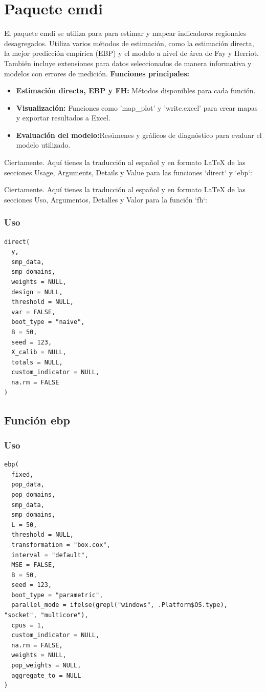 \documentclass[12pt,spanish]{article}
\begin{document}
\section*{Paquete emdi}

El paquete emdi se utiliza para para estimar y mapear indicadores regionales desagregados. Utiliza varios métodos de estimación, como la estimación directa, la mejor predicción empírica (EBP) y el modelo a nivel de área de Fay y Herriot. También incluye extensiones para datos seleccionados de manera informativa y modelos con errores de medición.
\textbf{Funciones principales:}
\begin{itemize}
    \item \textbf{Estimación directa, EBP y FH:} Métodos disponibles para cada función.
    \item \textbf{Visualización:} Funciones como 'map\_plot' y 'write.excel' para crear mapas y exportar resultados a Excel.
    \item \textbf{Evaluación del modelo:}Resúmenes y gráficos de diagnóstico para evaluar el modelo utilizado.
\end{itemize}

Ciertamente. Aquí tienes la traducción al español y en formato LaTeX de las secciones Usage, Arguments, Details y Value para las funciones `direct` y `ebp`:

Ciertamente. Aquí tienes la traducción al español y en formato LaTeX de las secciones Uso, Argumentos, Detalles y Valor para la función `fh`:

\subsubsection*{Uso}
\begin{verbatim}
direct(
  y,
  smp_data,
  smp_domains,
  weights = NULL,
  design = NULL,
  threshold = NULL,
  var = FALSE,
  boot_type = "naive",
  B = 50,
  seed = 123,
  X_calib = NULL,
  totals = NULL,
  custom_indicator = NULL,
  na.rm = FALSE
)
\end{verbatim}


\subsection*{Función ebp}

\subsubsection*{Uso}
\begin{verbatim}
ebp(
  fixed,
  pop_data,
  pop_domains,
  smp_data,
  smp_domains,
  L = 50,
  threshold = NULL,
  transformation = "box.cox",
  interval = "default",
  MSE = FALSE,
  B = 50,
  seed = 123,
  boot_type = "parametric",
  parallel_mode = ifelse(grepl("windows", .Platform$OS.type), "socket", "multicore"),
  cpus = 1,
  custom_indicator = NULL,
  na.rm = FALSE,
  weights = NULL,
  pop_weights = NULL,
  aggregate_to = NULL
)
\end{verbatim}
\end{document}
